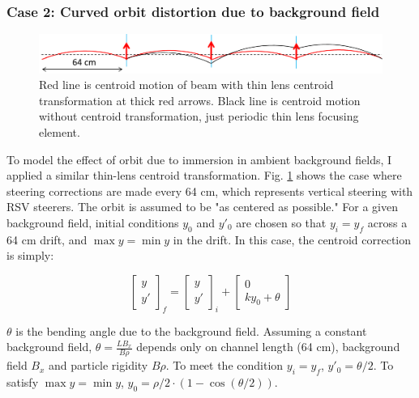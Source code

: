 \subsubsection{Case 2: Curved orbit distortion due to background field}

\begin{figure}
\centering
\includegraphics[width=\textwidth]{7.figures/steeringtolerance/vert_bg_field_distortion_cartoon.png}
\caption{Red line is centroid motion of beam with thin lens centroid transformation at thick red arrows. Black line is centroid motion without centroid transformation, just periodic thin lens focusing element.}
\label{fig:vertcurvedorbitdistortion}
\end{figure}

To model the effect of orbit  due to immersion in ambient background fields, I applied a similar thin-lens centroid transformation. Fig. \ref{fig:vertcurvedorbitdistortion} shows the case where steering corrections are made every 64 cm, which represents vertical steering with RSV steerers. The orbit is assumed to be "as centered as possible." For a given background field, initial conditions $y_0$ and $y'_0$ are chosen so that $y_i=y_f$ across a 64 cm drift, and $\max{y}=\min{y}$ in the drift. In this case, the centroid correction is simply:

\begin{equation}
\begin{bmatrix} y \\ y' \end{bmatrix}_f = \begin{bmatrix} y \\ y' \end{bmatrix}_i + \begin{bmatrix} 0 \\ ky_0 + \theta \end{bmatrix}
\label{eq:curvedorbitdistortion}
\end{equation}

$\theta$ is the bending angle due to the background field. Assuming a constant background field, $\theta = \frac{LB_x}{B \rho}$ depends only on channel length (64 cm), background field $B_x$ and particle rigidity $B \rho$. To meet the condition $y_i=y_f$, $y'_0 = \theta/2$. To satisfy $\max{y}=\min{y}$, $y_0=\rho/2 \cdot ( 1-\cos{(\theta/2)} )$.    

